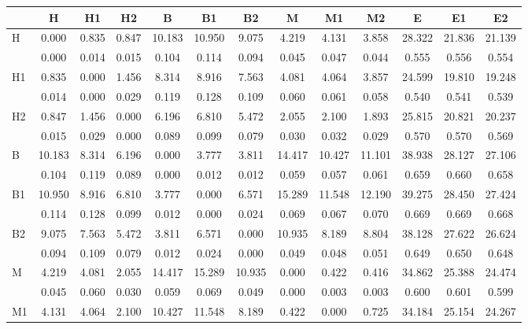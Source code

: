 \begin{table*}[h!]
\begin{center}
\begin{tabular}{| l | c | c | c | c | c | c | c | c | c | c | c | c |}\hline
 & H & H1 & H2 & B & B1 & B2 & M & M1 & M2 & E & E1 & E2 \\\hline
H & 0.000  & 0.835  & 0.847  & 10.183  & 10.950  & 9.075  & 4.219  & 4.131  & 3.858  & 28.322  & 21.836  & 21.139 \\\hline
 & 0.000  & 0.014  & 0.015  & 0.104  & 0.114  & 0.094  & 0.045  & 0.047  & 0.044  & 0.555  & 0.556  & 0.554 \\\hline
H1 & 0.835  & 0.000  & 1.456  & 8.314  & 8.916  & 7.563  & 4.081  & 4.064  & 3.857  & 24.599  & 19.810  & 19.248 \\\hline
 & 0.014  & 0.000  & 0.029  & 0.119  & 0.128  & 0.109  & 0.060  & 0.061  & 0.058  & 0.540  & 0.541  & 0.539 \\\hline
H2 & 0.847  & 1.456  & 0.000  & 6.196  & 6.810  & 5.472  & 2.055  & 2.100  & 1.893  & 25.815  & 20.821  & 20.237 \\\hline
 & 0.015  & 0.029  & 0.000  & 0.089  & 0.099  & 0.079  & 0.030  & 0.032  & 0.029  & 0.570  & 0.570  & 0.569 \\\hline
B & 10.183  & 8.314  & 6.196  & 0.000  & 3.777  & 3.811  & 14.417  & 10.427  & 11.101  & 38.938  & 28.127  & 27.106 \\\hline
 & 0.104  & 0.119  & 0.089  & 0.000  & 0.012  & 0.012  & 0.059  & 0.057  & 0.061  & 0.659  & 0.660  & 0.658 \\\hline
B1 & 10.950  & 8.916  & 6.810  & 3.777  & 0.000  & 6.571  & 15.289  & 11.548  & 12.190  & 39.275  & 28.450  & 27.424 \\\hline
 & 0.114  & 0.128  & 0.099  & 0.012  & 0.000  & 0.024  & 0.069  & 0.067  & 0.070  & 0.669  & 0.669  & 0.668 \\\hline
B2 & 9.075  & 7.563  & 5.472  & 3.811  & 6.571  & 0.000  & 10.935  & 8.189  & 8.804  & 38.128  & 27.622  & 26.624 \\\hline
 & 0.094  & 0.109  & 0.079  & 0.012  & 0.024  & 0.000  & 0.049  & 0.048  & 0.051  & 0.649  & 0.650  & 0.648 \\\hline
M & 4.219  & 4.081  & 2.055  & 14.417  & 15.289  & 10.935  & 0.000  & 0.422  & 0.416  & 34.862  & 25.388  & 24.474 \\\hline
 & 0.045  & 0.060  & 0.030  & 0.059  & 0.069  & 0.049  & 0.000  & 0.003  & 0.003  & 0.600  & 0.601  & 0.599 \\\hline
M1 & 4.131  & 4.064  & 2.100  & 10.427  & 11.548  & 8.189  & 0.422  & 0.000  & 0.725  & 34.184  & 25.154  & 24.267 \\\hline

\end{tabular}
\end{center}
\end{table*}
